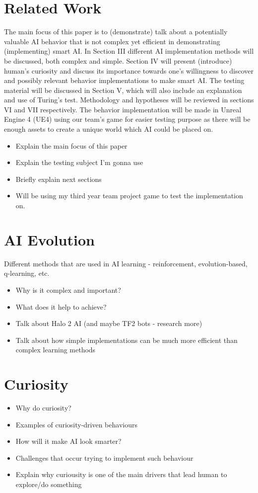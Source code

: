 \documentclass[journal]{IEEEtran}
\begin{document}
\section{Related Work} %
The main focus of this paper is to (demonstrate) talk about a potentially valuable AI behavior that is not complex yet efficient in demonstrating (implementing) smart AI. In Section III different AI implementation methods will be discussed, both complex and simple. Section IV will present (introduce) human's curiosity and discuss its importance towards one's willingness to discover and possibly relevant behavior implementations to make smart AI. The testing material will be discussed in Section V, which will also include an explanation and use of Turing's test. Methodology and hypotheses will be reviewed in sections VI and VII respectively. The behavior implementation will be made in Unreal Engine 4 (UE4) using our team's game for easier testing purpose as there will be enough assets to create a unique world which AI could be placed on.
\begin{itemize}
	\item Explain the main focus of this paper
	\item Explain the testing subject I'm gonna use
	\item Briefly explain next sections
	\item Will be using my third year team project game to test the implementation on.
\end{itemize}

\section{AI Evolution}
Different methods that are used in AI learning - reinforcement, evolution-based, q-learning, etc. 
\begin{itemize}
	\item Why is it complex and important?
	\item What does it help to achieve? 
	\item Talk about Halo 2 AI (and maybe TF2 bots - research more)
	\item Talk about how simple implementations can be much more efficient than complex learning methods
\end{itemize}

\section{Curiosity}
\begin{itemize}
	\item Why do curiosity?
	\item Examples of curiosity-driven behaviours
	\item How will it make AI look smarter?
	\item Challenges that occur trying to implement such behaviour
	\item Explain why curiousity is one of the main drivers that lead human to explore/do something
\end{itemize}
\end{document}
